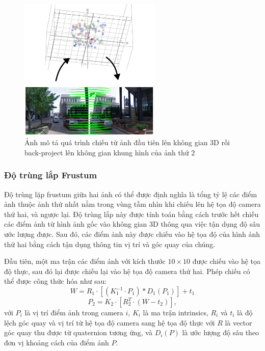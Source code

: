 \begin{figure}
  \centering
  \includegraphics[width=0.6\textwidth]{pics/Proposal/project.drawio.png}
  \caption[Quá trình chiếu giữa 2 ảnh]{Ảnh mô tả quá trình chiếu từ ảnh đầu tiên lên không gian 3D rồi back-project lên không gian khung hình của ảnh thứ 2}
\end{figure}

\subsubsection*{Độ trùng lắp Frustum}

Độ trùng lặp frustum giữa hai ảnh có thể được định nghĩa là tổng tỷ lệ các điểm ảnh thuộc ảnh thứ nhất nằm trong vùng tầm nhìn khi chiếu lên hệ tọa độ camera thứ hai, và ngược lại. Độ trùng lắp này được tính toán bằng cách trước hết chiếu các điểm ảnh từ hình ảnh gốc vào không gian 3D thông qua việc tận dụng độ sâu ước lượng được. Sau đó, các điểm ảnh này được chiếu vào hệ tọa độ của hình ảnh thứ hai bằng cách tận dụng thông tin vị trí và góc quay của chúng.

Đầu tiên, một ma trận các điểm ảnh với kích thước $10\times 10$ được chiếu vào hệ tọa độ thực, sau đó lại được chiếu lại vào hệ tọa độ camera thứ hai. Phép chiếu có thể được công thức hóa như sau:
\begin{equation}
  W = R_1\cdot \left[(K_1^{-1} \cdot P_1)*D_1(P_1)\right] + t_1
\end{equation}
\begin{equation}
  P_2 = K_2 \cdot\left[R_2^{T} \cdot (W - t_2)\right],
\end{equation}
với $P_i$ là vị trí điểm ảnh trong camera $i$, $K_i$ là ma trận intrinsics, $R_i$ và $t_i$ là độ lệch góc quay và vị trí từ hệ tọa độ camera sang hệ tọa độ thực với $R$ là vector góc quay thu được từ quaternion tương ứng, và $D_i(P)$ là ước lượng độ sâu theo đơn vị khoảng cách của điểm ảnh $P$.

